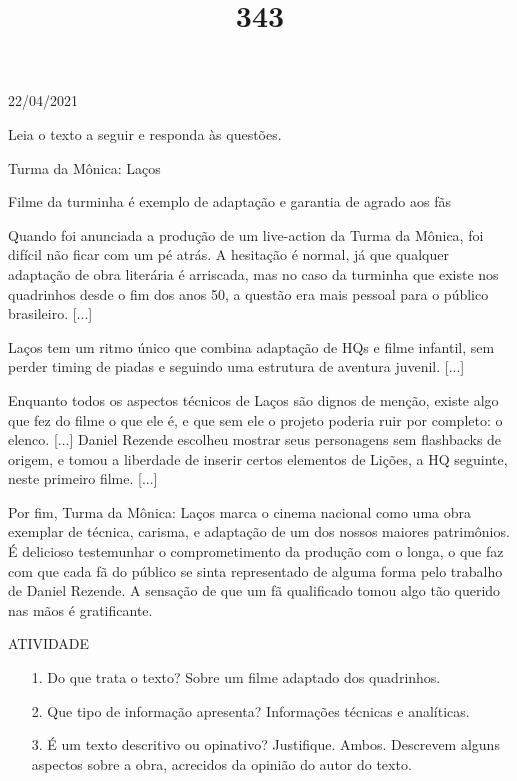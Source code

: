 \documentclass{SchoolBook}
\begin{document}
    \begin{day}{22/04/2021}
        \title{3}{Leia o texto a seguir e responda às questões.}
        \title{4}{Turma da Mônica: Laços}
        
        Filme da turminha é exemplo de adaptação e garantia de agrado aos fãs

        Quando foi anunciada a produção de um live-action da Turma da Mônica, foi difícil não ficar com um pé atrás. A hesitação é normal, já que qualquer adaptação de obra literária é arriscada, mas no caso da turminha que existe nos quadrinhos desde o fim dos anos 50, a questão era mais pessoal para o público brasileiro. [...]

        Laços tem um ritmo único que combina adaptação de HQs e filme infantil, sem perder timing de piadas e seguindo uma estrutura de aventura juvenil. [...]

        Enquanto todos os aspectos técnicos de Laços são dignos de menção, existe algo que fez do filme o que ele é, e que sem ele o projeto poderia ruir por completo: o elenco. [...] Daniel Rezende escolheu mostrar seus personagens sem flashbacks de origem, e tomou a liberdade de inserir certos elementos de Lições, a HQ seguinte, neste primeiro filme. [...]

        Por fim, Turma da Mônica: Laços marca o cinema nacional como uma obra exemplar de técnica, carisma, e adaptação de um dos nossos maiores patrimônios. É delicioso testemunhar o comprometimento da produção com o longa, o que faz com que cada fã do público se sinta representado de alguma forma pelo trabalho de Daniel Rezende. A sensação de que um fã qualificado tomou algo tão querido nas mãos é gratificante.

        \title{3}{ATIVIDADE}

        \begin{enumerate}
            \item[1.] Do que trata o texto?
            \response Sobre um filme adaptado dos quadrinhos.

            \item[2.] Que tipo de informação apresenta?
            \response Informações técnicas e analíticas.

            \item[3.] É um texto descritivo ou opinativo? Justifique.
            \response Ambos. Descrevem alguns aspectos sobre a obra, acrecidos da opinião do autor do texto.


\end{enumerate}
\end{day}
\end{document}
